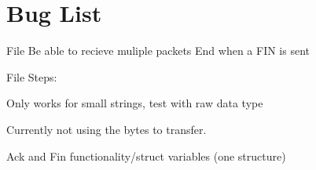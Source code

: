 \chapter{Bug List}
\hypertarget{bug}{}\label{bug}

\begin{DoxyRefList}
\item[File \doxylink{receiver_8c}{receiver.c} ]\label{bug__bug000001}%
%
Be able to recieve muliple packets End when a FIN is sent ~\newline
  
\item[File \doxylink{sender_8c}{sender.c} ]\label{bug__bug000002}%
%
Steps\+:
\begin{DoxyEnumerate}
\item Only works for small strings, test with raw data type
\item Currently not using the bytes to transfer.
\item Ack and Fin functionality/struct variables (one structure) 
\end{DoxyEnumerate}
\end{DoxyRefList}
